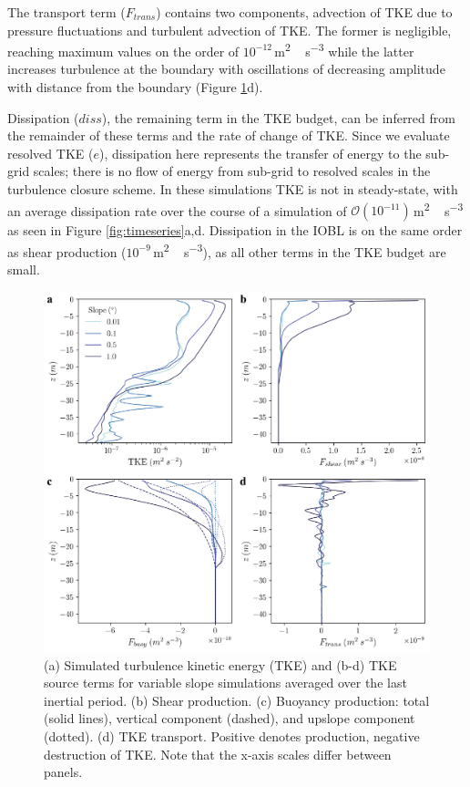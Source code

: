 \documentclass[tc, manuscript]{copernicus}
\begin{document}
The transport term ($F_{trans}$) contains two components, advection of TKE due to pressure fluctuations and turbulent advection of TKE. The former is negligible, reaching maximum values on the order of $10^{-12}$\,\unit{m^2\,s^{-3}} while the latter increases turbulence at the boundary with oscillations of decreasing amplitude with distance from the boundary (Figure \ref{fig:tke_budget}d). 

Dissipation ($diss$), the remaining term in the TKE budget, can be inferred from the remainder of these terms and the rate of change of TKE. Since we evaluate resolved TKE ($e$), dissipation here represents the transfer of energy to the sub-grid scales; there is no flow of energy from sub-grid to resolved scales in the turbulence closure scheme. In these simulations TKE is not in steady-state, with an average  dissipation rate over the course of a simulation of $\mathcal{O}(10^{-11})$\,\unit{m^2\,s^{-3}} as seen in Figure \ref{fig:timeseries}a,d. Dissipation in the IOBL is on the same order as shear production ($10^{-9}$\,\unit{m^2\,s^{-3}}), as all other terms in the TKE budget are small. 

\begin{figure}[t]
\includegraphics[width=12cm]{fig4.pdf}
\caption{(a) Simulated turbulence kinetic energy (TKE) and (b-d) TKE source terms for variable slope simulations averaged over the last inertial period. (b) Shear production. (c) Buoyancy production: total (solid lines), vertical component (dashed), and upslope component (dotted). (d) TKE transport. Positive denotes production, negative destruction of TKE. Note that the x-axis scales differ between panels.}
\label{fig:tke_budget}
\end{figure}
\end{document}
